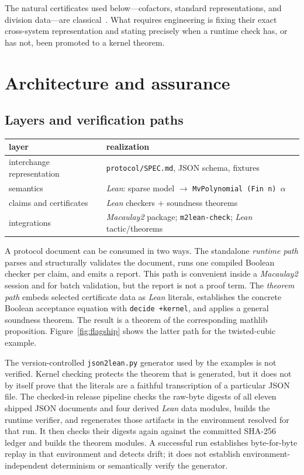 \documentclass[11pt]{article}
\newcommand{\M}{\textit{Macaulay2}}
\newcommand{\lean}{\textit{Lean}}
\newcommand{\mathlib}{\textsf{mathlib}}
\newcommand{\code}[1]{\texttt{#1}}
\begin{document}
The natural certificates used below---cofactors, standard
representations, and division data---are classical~\cite{clo,
becker-weispfenning}.  What requires engineering is fixing their exact
cross-system representation and stating precisely when a runtime
check has, or has not, been promoted to a kernel theorem.

\section{Architecture and assurance}\label{sec:trust}

\subsection{Layers and verification paths}

\begin{center}
\begin{tabular}{ll}
\toprule
layer & realization \\
\midrule
interchange representation & \code{protocol/SPEC.md}, JSON schema, fixtures \\
semantics & \lean{}: sparse model $\to$ \code{MvPolynomial (Fin n) $\alpha$} \\
claims and certificates & \lean{} checkers $+$ soundness theorems \\
integrations & \M{} package; \code{m2lean-check}; \lean{} tactic/theorems \\
\bottomrule
\end{tabular}
\end{center}

A protocol document can be consumed in two ways.  The standalone
\emph{runtime path} parses and structurally validates the document,
runs one compiled Boolean checker per claim, and emits a report.  This
path is convenient inside a \M{} session and for batch validation, but
the report is not a proof term.  The \emph{theorem path} embeds selected
certificate data as \lean{} literals, establishes the concrete Boolean
acceptance equation with \code{decide +kernel}, and applies a general
soundness theorem.  The result is a theorem of the corresponding
\mathlib{} proposition.  Figure~\ref{fig:flagship} shows the latter
path for the twisted-cubic example.

The version-controlled \code{json2lean.py} generator used by the
examples is not verified.  Kernel checking protects the theorem that
is generated, but it does not by itself prove that the literals are a
faithful transcription of a particular JSON file.  The checked-in
release pipeline checks the raw-byte digests of all eleven shipped JSON
documents and four derived \lean{} data modules, builds the runtime
verifier, and regenerates those artifacts in the environment resolved for
that run.  It then checks their digests again against the committed SHA-256
ledger and builds the theorem modules.  A successful run establishes byte-for-byte
replay in that environment and detects drift; it does not establish
environment-independent determinism or semantically verify the generator.
\end{document}
